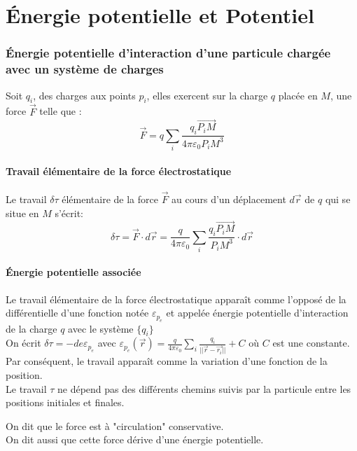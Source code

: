 \documentclass[../main.tex]{subfile}
\begin{document}
\part{Énergie potentielle et Potentiel}

\section{Énergie potentielle d'interaction d'une particule chargée avec un système de charges}

Soit $q_i$, des charges aux points $p_i$, elles exercent sur la charge $q$ placée en $M$, une force $\vec{F}$ telle que :\\
$$\vec{F} = q \sum\limits_i \frac{q_i\vec{P_iM}}{4\pi\varepsilon_0 P_iM^3}$$

\subsection{Travail élémentaire de la force électrostatique}
Le travail $\delta \tau$ élémentaire de la force $\vec{F}$ au cours d'un déplacement $d\vec{r}$ de $q$ qui se situe en $M$ s'écrit:
$$\delta\tau = \vec{F} \cdot d\vec{r} = \frac{q}{4\pi\varepsilon_0} \sum\limits_i \frac{q_i \vec{P_iM}}{P_iM^3} \cdot d\vec{r}$$


\subsection{Énergie potentielle associée}
Le travail élémentaire de la force électrostatique apparaît comme l'opposé de la différentielle d'une fonction notée $\varepsilon_{p_e}$ et appelée énergie potentielle d'interaction de la charge $q$ avec le système $\{q_i\}$\\
On écrit $\delta\tau = -de \varepsilon_{p_e}$ avec $\varepsilon_{p_e}(\vec{r}) = \frac{q}{4\pi\varepsilon_0} \sum\limits_i \frac{q_i}{||\vec{r} - \vec{r_i}||} + C$ où $C$ est une constante.\\

Par conséquent, le travail apparaît comme la variation d'une fonction de la position.\\
Le travail $\tau$ ne dépend pas des différents chemins suivis par la particule entre les positions initiales et finales.\\

\begin{rema}
	On dit que le force est à "circulation" conservative.\\
	On dit aussi que cette force dérive d'une énergie potentielle.
\end{rema}
\end{document}
